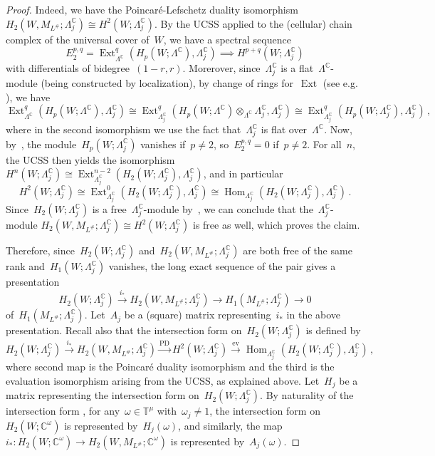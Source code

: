 \documentclass{amsart}
\newcommand{\C}{\mathbb{C}}
\newcommand{\T}{\mathbb{T}}
\newcommand{\LambdaC}{\Lambda^{\mathbb{C}}}
\theoremstyle{definition}
\theoremstyle{remark}
\begin{document}
\begin{proof}
		Indeed, we have the Poincaré-Lefschetz duality isomorphism~$H_2(W,M_{L^\#};\LambdaC_j)\cong H^2(W; \LambdaC_j)$. By the UCSS applied to the (cellular) chain complex of the universal cover of~$W$, we have a spectral sequence
		$$E_2^{p,q}=\operatorname{Ext}_{\LambdaC}^q(H_p(W;\LambdaC),\LambdaC_j) \implies H^{p+q} (W;\LambdaC_j)$$
		with differentials of bidegree~$(1-r,r)$.
		Morerover, since~$\LambdaC_j$ is a flat~$\LambdaC$-module (being constructed by localization), by change of rings for~$\operatorname{Ext}$ (see e.g. \cite[Chapter~IV, Proposition~12.2]{HS97}), we have
		$$ \operatorname{Ext}_{\LambdaC}^q(H_p(W;\LambdaC),\LambdaC_j) \cong \operatorname{Ext}_{\LambdaC_j}^q(H_p(W;\LambdaC)\otimes_{\LambdaC} \LambdaC_j,\LambdaC_j) \cong \operatorname{Ext}_{\LambdaC_j}^q(H_p(W;\LambdaC_j),\LambdaC_j)\,, $$
		where in the second isomorphism we use the fact that~$\LambdaC_j$ is flat over~$\LambdaC$.	
		Now, by~\cite[Lemma~B.8]{CMP23}, the module~$H_p(W;\LambdaC_j)$ vanishes if~$p\neq 2$, so~$E_2^{p,q} = 0$ if~$p\neq 2$. For all~$n$, the UCSS then yields the isomorphism~$H^n(W;\LambdaC_j) \cong \operatorname{Ext}_{\LambdaC_j}^{n-2}(H_2(W;\LambdaC_j), \LambdaC_j)$, and in particular
		$$ H^2(W;\LambdaC_j) \cong \operatorname{Ext}_{\LambdaC_j}^0(H_2(W;\LambdaC_j),\LambdaC_j) \cong \operatorname{Hom}_{\LambdaC_j}(H_2(W;\LambdaC_j), \LambdaC_j)\,.$$
		Since~$H_2(W;\LambdaC_j)$ is a free~$\LambdaC_j$-module by~\cite[Lemma B.7]{CMP23}, we can conclude that the~$\LambdaC_j$-module $H_2(W,M_{L^\#};\LambdaC_j) \cong H^2 (W;\LambdaC_j)$ is free as well, which proves the claim.
	
		Therefore, since~$H_2(W;\LambdaC_j)$ and~$H_2(W,M_{L^\#};\LambdaC_j)$ are both free of the same rank
		and~$H_1(W;\LambdaC_j)$ vanishes, the long exact sequence of the pair gives a presentation
		$$H_2(W; \LambdaC_j)\stackrel{i_*}{\longrightarrow} H_2(W,M_{L^\#}; \LambdaC_j) \longrightarrow H_1(M_{L^\#}; \LambdaC_j) \longrightarrow 0$$
		of~$H_1(M_{L^\#};\LambdaC_j)$. Let~$A_j$ be a (square) matrix representing~$i_*$ in the above presentation. Recall also that the intersection form on~$H_2(W;\LambdaC_j)$ is defined by 
		$$
		H_2(W;\LambdaC_j) \stackrel{i_*}{\longrightarrow} H_2(W,M_{L^\#};\LambdaC_j) \stackrel{\mathrm{PD}}{\longrightarrow} H^2(W;\LambdaC_j)\stackrel{\mathrm{ev}}{\longrightarrow} \operatorname{Hom}_{\LambdaC_j}(H_2(W;\LambdaC_j),\LambdaC_j)\,,$$
		where second map is the Poincaré duality isomorphism and the third is the evaluation isomorphism arising from the UCSS, as explained above. Let~$H_j$ be a matrix representing the intersection form on~$H_2(W;\LambdaC_j)$. By naturality of the intersection form \cite[Lemma B.5]{CMP23}, for any~$\omega\in\T^\mu$ with~$\omega_j \neq 1$, the intersection form on~$H_2(W;\C^\omega)$ is represented by~$H_j(\omega)$, and similarly, the map~$i_*:H_2(W;\C^\omega)\longrightarrow H_2(W,M_{L^\#};\C^\omega)$ is represented by~$A_j(\omega)$.
	

\end{proof}
\end{document}
